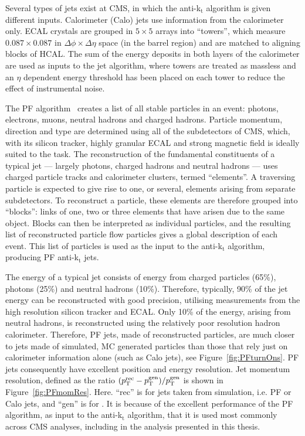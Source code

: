 Several types of jets exist at \ac{CMS}, in which the anti-k$_{\mathrm{t}}$ algorithm is given different inputs.
Calorimeter (Calo) jets use information from the calorimeter only.
\ac{ECAL} crystals are grouped in $5\times5$ arrays into ``towers'', which measure $0.087\times0.087$ in $\Delta\phi \times \Delta \eta$ space (in the barrel region) and are matched to aligning blocks of \ac{HCAL}.
The sum of the energy deposits in both layers of the calorimeter are used as inputs to the jet algorithm, where towers are treated as massless and an $\eta$ dependent energy threshold has been placed on each tower to reduce the effect of instrumental noise. 

The \ac{PF} algorithm~\cite{PFT-09-001} creates a list of all stable particles in an event: photons, electrons, muons, neutral hadrons and charged hadrons.
Particle momentum, direction and type are determined using all of the subdetectors of \ac{CMS}, 
which, with its silicon tracker, highly granular \ac{ECAL} and strong magnetic field is ideally suited to the task.
The reconstruction of the fundamental constituents of a typical jet --- largely photons, charged hadrons and neutral hadrons --- uses charged particle tracks and calorimeter clusters, termed ``elements''.
A traversing particle is expected to give rise to one, or several, elements arising from separate subdetectors. 
To reconstruct a particle, these elements are therefore grouped into ``blocks'': links of one, two or three elements
that have arisen due to the same object.
Blocks can then be interpreted as individual particles, and the resulting list of reconstructed particle flow particles 
gives a global description of each event.
This list of particles is used as the input to the anti-k$_{\mathrm{t}}$ algorithm, producing \ac{PF} anti-k$_{\mathrm{t}}$ jets.

The energy of a typical jet consists of energy from charged particles (65\%), photons (25\%) and neutral hadrons (10\%).
Therefore, typically, 90\% of the jet energy can be reconstructed with good precision, utilising measurements from the high resolution silicon tracker and \ac{ECAL}. 
Only 10\% of the energy, arising from neutral hadrons, is reconstructed using the relatively poor resolution hadron calorimeter. 
Therefore, \ac{PF} jets, made of reconstructed particles, are much closer to  jets made of simulated, \ac{MC} generated particles than those that rely just on calorimeter information alone (such as Calo jets), see Figure~\ref{fig:PFturnOns}.
\ac{PF} jets consequently have excellent position and energy resolution. 
Jet momentum resolution, defined as the ratio $(p_{\text{T}}^{\mathrm{rec}} - p_{\text{T}}^{\mathrm{gen}})/p_{\text{T}}^{\mathrm{gen}}$ is shown in Figure~\ref{fig:PFmomRes}. 
Here. ``rec'' is for jets taken from  simulation, i.e. \ac{PF} or Calo jets, and ``gen'' is for  .
It is because of the excellent performance of the \ac{PF} algorithm, as input to the anti-k$_{\mathrm{t}}$ algorithm, that it is used most commonly across \ac{CMS} analyses, including in the analysis presented in this thesis.

